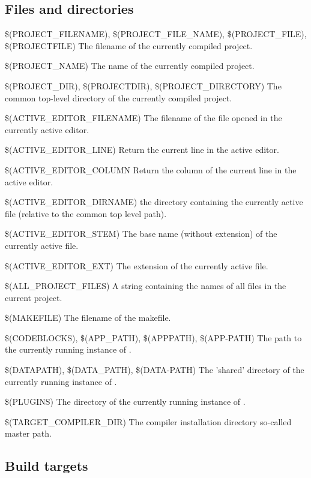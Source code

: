 \subsection{Files and directories}

\begin{codeentry}
\item[\$(PROJECT\_FILENAME), \$(PROJECT\_FILE\_NAME), \$(PROJECT\_FILE), \$(PROJECTFILE)] The filename of the currently compiled project.
\item[\$(PROJECT\_NAME)] The name of the currently compiled project.
\item[\$(PROJECT\_DIR), \$(PROJECTDIR), \$(PROJECT\_DIRECTORY)] The common top-level directory of the currently compiled project.
\item[\$(ACTIVE\_EDITOR\_FILENAME)] The filename of the file opened in the currently active editor.
\item[\$(ACTIVE\_EDITOR\_LINE)] Return the current line in the active editor.
\item[\$(ACTIVE\_EDITOR\_COLUMN] Return the column of the current line in the active editor.
\item[\$(ACTIVE\_EDITOR\_DIRNAME)] the directory containing the currently active file (relative to the common top level path).
\item[\$(ACTIVE\_EDITOR\_STEM)] The base name (without extension) of the currently active file.
\item[\$(ACTIVE\_EDITOR\_EXT)] The extension of the currently active file.
\item[\$(ALL\_PROJECT\_FILES)] A string containing the names of all files in the current project.
\item[\$(MAKEFILE)] The filename of the makefile.
\item[\$(CODEBLOCKS), \$(APP\_PATH), \$(APPPATH), \$(APP-PATH)] The path to the currently running instance of \codeblocks.
\item[\$(DATAPATH), \$(DATA\_PATH), \$(DATA-PATH)] The 'shared' directory of the currently running instance of \codeblocks.
\item[\$(PLUGINS)] The  directory of the currently running instance of \codeblocks.
\item[\$(TARGET\_COMPILER\_DIR)] The compiler installation directory so-called master path.
\end{codeentry}

\subsection{Build targets}

